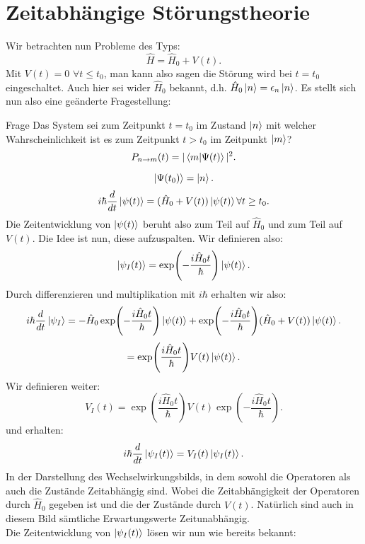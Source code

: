 \documentclass{report}
\begin{document}
\section{Zeitabhängige Störungstheorie}
Wir betrachten nun Probleme des Typs: \[
	\hat{H} = \hat{H}_0 + V(t)
.\] Mit $V(t)=0$ $ \forall t \le t_0$, man kann also sagen die Störung wird bei $t = t_0$ eingeschaltet. Auch hier sei wider $\hat{H}_0$ bekannt, d.h. $\hat{H}_0 \ket{n} = \epsilon_n \ket{n} $. 
Es stellt sich nun also eine geänderte Fragestellung:
\begin{greenbox}{Frage}
	Das System sei zum Zeitpunkt $t = t_0$ im Zustand $\ket{n} $ mit welcher Wahrscheinlichkeit ist es zum Zeitpunkt $t > t_0$ im Zeitpunkt $\ket{m} $? \[
		P_{n \to m}(t) = |\bra{m} \ket{\Psi(t)}|^2
	.\] 
\end{greenbox}
	\[
	\ket{\Psi(t_0)} = \ket{n} 
	.\] \[
	i \hbar \frac{d}{dt}\ket{\psi(t)} = (\hat{H}_0 + V(t))\ket{\psi(t)} \forall t \ge t_0
.\] Die Zeitentwicklung von $\ket{\psi(t)} $ beruht also zum Teil auf $\hat{H}_0$ und zum Teil auf $V(t)$. Die Idee ist nun, diese aufzuspalten. Wir definieren also: \[
\ket{\psi_I(t)} = \exp(-\frac{i \hat{H}_0 t}{\hbar}) \ket{\psi(t)} 
 .\] Durch differenzieren und multiplikation mit $i\hbar$ erhalten wir also: \[
 i \hbar \frac{d}{dt} \ket{\psi_I}  = -\hat{H}_0 \exp(-\frac{i \hat{H}_0 t}{\hbar}) \ket{\psi(t)} + \exp(-\frac{i \hat{H}_0 t}{\hbar}) (\hat{H}_0 + V(t)) \ket{\psi(t)} 
.\] \[
= \exp(\frac{i \hat{H}_0 t}{\hbar}) V(t) \ket{\psi(t)} 
.\]  
Wir definieren weiter: \[
	V_I(t) = \exp(\frac{i \hat{H}_0 t}{\hbar}) V(t) \exp(-\frac{i \hat{H}_0 t}{\hbar}) 
.\] und erhalten: \[
i \hbar \frac{d}{dt} \ket{\psi_I(t)} = V_I(t) \ket{\psi_I(t)} 
.\] In der Darstellung des Wechselwirkungsbilds, in dem sowohl die Operatoren als auch die Zustände Zeitabhängig sind. Wobei die Zeitabhängigkeit der Operatoren durch $\hat{H}_0$ gegeben ist und die der Zustände durch $V(t)$. Natürlich sind auch in diesem Bild sämtliche Erwartungswerte Zeitunabhängig. \\
Die Zeitentwicklung von $\ket{\psi_I(t)} $ lösen wir nun wie bereits bekannt: \\
\end{document}

